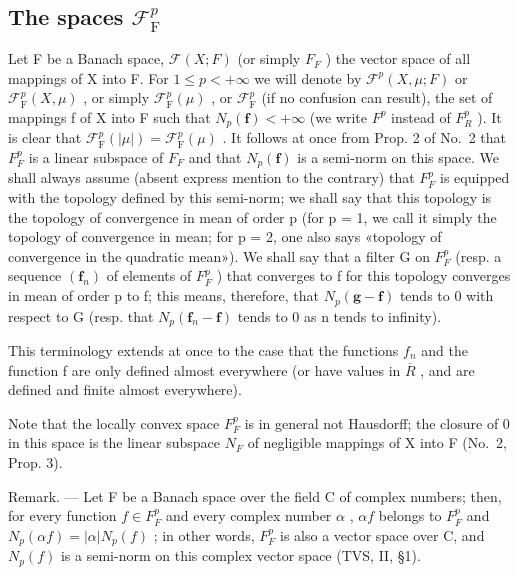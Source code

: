 \subsection{\texorpdfstring{The spaces \(\mathcal{F}_{\mathrm{F}}^{p}\)}{The spaces F sub F to the p}}

Let F be a Banach space, \(\mathcal{F}(X;F)\) (or simply \(F_{F}\) ) the vector space of all mappings of X into F. For \(1 \leqslant p < +\infty\) we will denote by \(\mathcal{F}^{p}(X,\mu;F)\) or \(\mathcal{F}_{\mathrm{F}}^{p}(X,\mu)\) , or simply \(\mathcal{F}_{\mathrm{F}}^{p}(\mu)\) , or \(\mathcal{F}_{\mathrm{F}}^{p}\) (if no confusion can result), the set of mappings f of X into F such that \(N_{p}(\mathbf{f}) < +\infty\) (we write \(F^{p}\) instead of \(F_{R}^{p}\) ). It is clear that \(\mathcal{F}_{\mathrm{F}}^{p}(|\mu|) = \mathcal{F}_{\mathrm{F}}^{p}(\mu)\) . It follows at once from Prop. 2 of No.~2 that \(F_{F}^{p}\) is a linear subspace of \(F_{F}\) and that \(N_{p}(\mathbf{f})\) is a semi-norm on this space. We shall always assume (absent express mention to the contrary) that \(F_{F}^{p}\) is equipped with the topology defined by this semi-norm; we shall say that this topology is the topology of convergence in mean of order p (for p = 1, we call it simply the topology of convergence in mean; for p = 2, one also says «topology of convergence in the quadratic mean»). We shall say that a filter G on \(F_{F}^{p}\) (resp. a sequence \((\mathbf{f}_{n})\) of elements of \(F_{F}^{p}\) ) that converges to f for this topology converges in mean of order p to f; this means, therefore, that \(N_{p}(\mathbf{g}-\mathbf{f})\) tends to 0 with respect to G (resp. that \(N_{p}(\mathbf{f}_{n}-\mathbf{f})\) tends to 0 as n tends to infinity).

This terminology extends at once to the case that the functions \(f_{n}\) and the function f are only defined almost everywhere (or have values in \(\overline{R}\) , and are defined and finite almost everywhere).

Note that the locally convex space \(F_{F}^{p}\) is in general not Hausdorff; the closure of 0 in this space is the linear subspace \(N_{F}\) of negligible mappings of X into F (No.~2, Prop. 3).

Remark. --- Let F be a Banach space over the field C of complex numbers; then, for every function \(f \in F_{F}^{p}\) and every complex number \(\alpha\) , \(\alpha f\) belongs to \(F_{F}^{p}\) and \(N_{p}(\alpha f) = |\alpha| N_{p}(f)\) ; in other words, \(F_{F}^{p}\) is also a vector space over C, and \(N_{p}(f)\) is a semi-norm on this complex vector space (TVS, II, §1).

